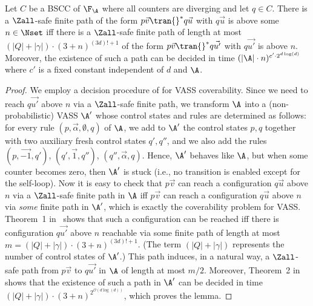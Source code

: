 \begin{lemma}
\label{lem:cover-short-path}
 Let $C$ be a BSCC of $\F_{\A}$ where all counters are diverging and let $q\in C$. There is a $\Zall$-safe finite path of the form $p\vec{v}\tran{}^* q\vec{u}$ with $q\vec{u}$ is above some $n\in \Nset$ iff there is a $\Zall$-safe finite path of length at most $(|Q|+|\gamma|)\cdot(3+n)^{(3d)!+1}$ of the form $p\vec{v}\tran{}^* q\vec{u'}$ with $q\vec{u'}$ is above $n$. Moreover, the existence of such a path can be decided in time $(|\A|\cdot n)^{c'\cdot 2^{d\log(d)}}$ where $c'$ is a fixed constant independent of $d$ and $\A$.
\end{lemma}
\begin{proof}
  We employ a decision procedure of \cite{BG:VASS-coverability} for
  VASS coverability. Since we need to reach $q\vec{u'}$ above $n$ via
  a $\Zall$-safe finite path, we transform $\A$ into a
  (non-probabilistic) VASS $\A'$ whose control states and rules are
  determined as follows: for every rule $(p,\vec{\alpha},\emptyset,q)$
  of $\A$, we add to $\A'$ the control states $p,q$ together with two
  auxiliary fresh control states $q',q''$, and we also add the rules
  $(p,\vec{-1},q')$, $(q',\vec{1},q'')$,
  $(q'',\vec{\alpha},q)$. Hence, $\A'$ behaves like $\A$, but when
  some counter becomes zero, then $\A'$ is stuck (i.e., no transition
  is enabled except for the self-loop). Now it is easy to check that
  $p\vec{v}$ can reach a configuration $q\vec{u}$ above $n$ via a
  $\Zall$-safe finite path in $\A$ iff $p\vec{v}$ can reach a
  configuration $q\vec{u}$ above $n$ via \emph{some} finite path in
  $\A'$, which is exactly the coverability problem for VASS. 
  Theorem~1 in~\cite{BG:VASS-coverability} shows that such a
  configuration can be reached iff there is configuration $q\vec{u'}$
  above $n$ reachable via some finite path of length at most $m =
  (|Q|+|\gamma|)\cdot(3+n)^{(3d)!+1}$. (The term $(|Q|+|\gamma|)$
  represents the number of control states of $\A'$.) This path
  induces, in a natural way, a $\Zall$-safe path from $p\vec{v}$ to
  $q\vec{u'}$ in $\A$ of length at most $m/2$. Moreover, Theorem~2
  in~\cite{BG:VASS-coverability} shows that the existence of such a
  path in $\A'$ can be decided in time
  $(|Q|+|\gamma|)\cdot(3+n)^{2^{\mathcal{O}(d\log(d))}}$, which proves
  the lemma. \end{proof}



